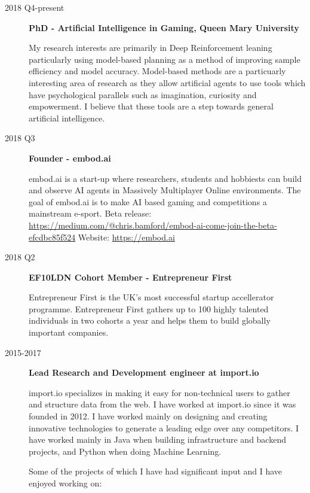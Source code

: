\documentclass[a4paper]{article}
\begin{document}
\begin{description}
\item[2018 Q4-present]
\textbf{PhD - Artificial Intelligence in Gaming, Queen Mary University}

My research interests are primarily in Deep Reinforcement leaning
particularly using model-based planning as a method of improving sample
efficiency and model accuracy. Model-based methods are a particuarly
interesting area of research as they allow artificial agents to use
tools which have psychological parallels such as imagination, curiosity
and empowerment. I believe that these tools are a step towards general
artificial intelligence.
\item[2018 Q3]
\textbf{Founder - embod.ai}

embod.ai is a start-up where researchers, students and hobbiests can
build and observe AI agents in Massively Multiplayer Online
environments. The goal of embod.ai is to make AI based gaming and
competitions a mainstream e-sport. Beta release:
\url{https://medium.com/@chris.bamford/embod-ai-come-join-the-beta-efcdbc85f524}
Website: \url{https://embod.ai}
\item[2018 Q2]
\textbf{EF10LDN Cohort Member - Entrepreneur First}

Entrepreneur First is the UK's most successful startup accellerator
programme. Entrepreneur First gathers up to 100 highly talented
individuals in two cohorts a year and helps them to build globally
important companies.
\item[2015-2017]
\textbf{Lead Research and Development engineer at import.io}

import.io specializes in making it easy for non-technical users to
gather and structure data from the web. I have worked at import.io since
it was founded in 2012. I have worked mainly on designing and creating
innovative technologies to generate a leading edge over any competitors.
I have worked mainly in Java when building infrastructure and backend
projects, and Python when doing Machine Learning.

Some of the projects of which I have had significant input and I have
enjoyed working on:


\end{description}
\end{document}
